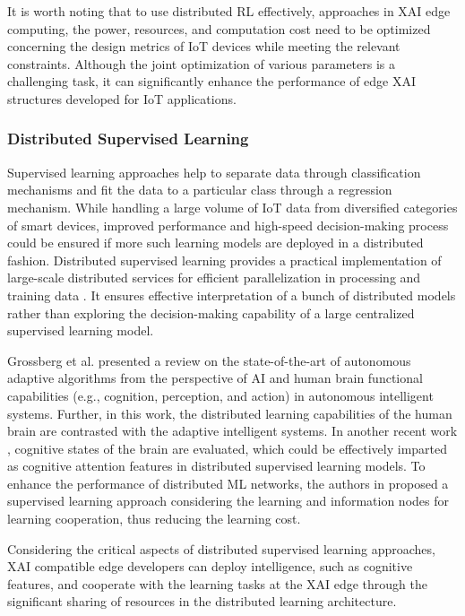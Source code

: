 \documentclass[journal]{IEEEtran}
\begin{document}
It is worth noting that to use distributed RL effectively, approaches in XAI edge computing, the power, resources, and computation cost need to be optimized concerning the design metrics of IoT devices while meeting the relevant constraints. Although the joint optimization of various parameters is a challenging task, it can significantly enhance the performance of edge XAI structures developed for IoT applications. 

\subsubsection{Distributed Supervised Learning} 
Supervised learning approaches help to separate data through classification mechanisms and fit the data to a particular class through a regression mechanism. While handling a large volume of IoT data from diversified categories of smart devices, improved performance and high-speed decision-making process could be ensured if more such learning models are deployed in a distributed fashion. Distributed supervised learning provides a practical implementation of large-scale distributed services for efficient parallelization in processing and training data \cite{verbraeken2020survey}. It ensures effective interpretation of a bunch of distributed models rather than exploring the decision-making capability of a large centralized supervised learning model.

Grossberg et al. \cite{grossberg2020toward} presented a review on the state-of-the-art of autonomous adaptive algorithms from the perspective of AI and human brain functional capabilities (e.g., cognition, perception, and action) in autonomous intelligent systems. Further, in this work, the distributed learning capabilities of the human brain are contrasted with the adaptive intelligent systems. In another recent work \cite{grossberg2021attention}, cognitive states of the brain are evaluated, which could be effectively imparted as cognitive attention features in distributed supervised learning models. To enhance the performance of distributed ML networks, the authors in \cite{malandrino2021network} proposed a supervised learning approach considering the learning and information nodes for learning cooperation, thus reducing the learning cost. 

Considering the critical aspects of distributed supervised learning approaches, XAI compatible edge developers can deploy intelligence, such as cognitive features, and cooperate with the learning tasks at the XAI edge through the significant sharing of resources in the distributed learning architecture.  
\end{document}
